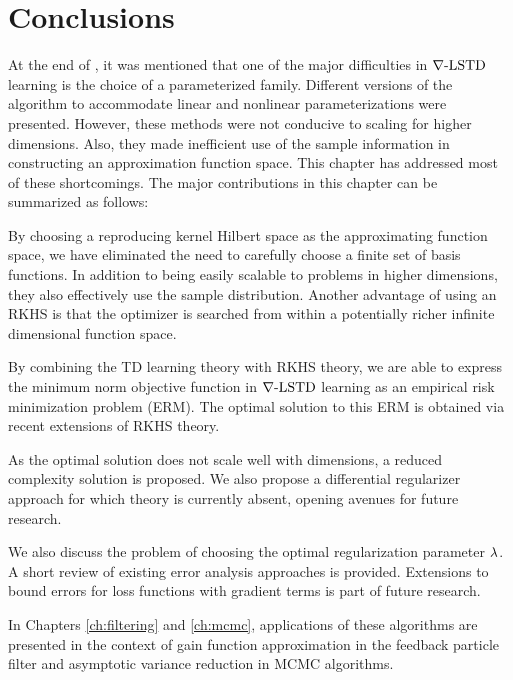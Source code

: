 \section{Conclusions}
\label{s:ch3_conclusions}
At the end of , it was mentioned that one of the major difficulties in $\nabla\text{-LSTD}$ learning is the choice of a parameterized family. Different versions of the algorithm to accommodate linear and nonlinear parameterizations were presented. However, these methods were not conducive to scaling for higher dimensions. Also, they made inefficient use of the sample information in constructing an approximation function space. This chapter has addressed most of these shortcomings. The major contributions in this chapter can be summarized as follows:

\begin{romannum}
\item By choosing a reproducing kernel Hilbert space as the approximating function space, we have eliminated the need to carefully choose a finite set of basis functions. In addition to being easily scalable to problems in higher dimensions, they also effectively use the sample distribution. Another advantage of using an RKHS is that the optimizer is searched from within a potentially richer infinite dimensional function space.  
\item By combining the TD learning theory with RKHS theory, we are able to express the minimum norm objective function in $\nabla\text{-LSTD}$ learning as an empirical risk minimization problem (ERM). The optimal solution to this ERM is obtained via recent extensions of RKHS theory. 
\item As the optimal solution does not scale well with dimensions, a reduced complexity solution is proposed. We also propose a differential regularizer approach for which theory is currently absent, opening avenues for future research.
\item We also discuss the problem of choosing the optimal regularization parameter $\lambda$. A short review of existing error analysis approaches is provided. Extensions to bound errors for loss functions with gradient terms is part of future research.
\item In Chapters \ref{ch:filtering} and \ref{ch:mcmc}, applications of these algorithms are presented in the context of gain function approximation in the feedback particle filter and asymptotic variance reduction in MCMC algorithms.  
\end{romannum}


